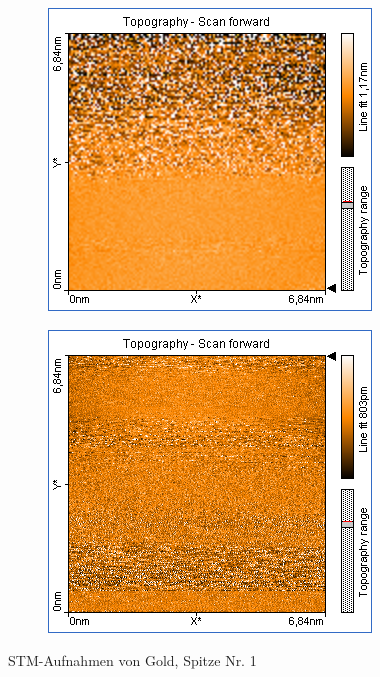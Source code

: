 \begin{figure}
\begin{subfigure}[b]{\picwidth}
        \caption{}
        \label{fig:gold_01_03}
    \end{subfigure}
    \begin{subfigure}[b]{\picwidth}
        \includegraphics[width=\textwidth]{data/Gold/pic_01_04_6nm}
        \caption{}
        \label{fig:gold_01_04}
    \end{subfigure}\qquad
    \begin{subfigure}[b]{\picwidth}
        \includegraphics[width=\textwidth]{data/Gold/pic_01_05_6nm}
        \caption{}
        \label{fig:gold_01_05}
    \end{subfigure}
    \caption{STM-Aufnahmen von Gold, Spitze Nr. 1}\label{fig:gold_02}
\end{figure}

